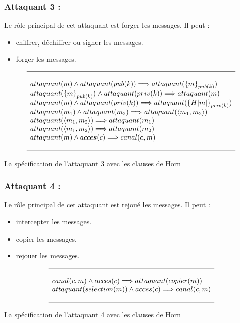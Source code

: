 \documentclass[10pt,a4paper]{article}
\begin{document}
\subsubsection{Attaquant 3 :}
Le rôle principal de cet attaquant est forger les messages. Il peut :
\begin{itemize}
\item chiffrer, déchiffrer ou signer les messages.
\item forger les messages.\\
\end{itemize}
\[
\begin{array}{l}
\hline
\\
attaquant(m)\wedge attaquant(pub(k))\Longrightarrow attaquant({\lbrace m\rbrace}_{pub(k)})
\\
attaquant({\lbrace m\rbrace}_{pub(k)}) \wedge attaquant(priv(k))\Longrightarrow attaquant(m) 
\\ 
attaquant(m)\wedge attaquant(priv(k))\Longrightarrow attaquant({\lbrace H|m|\rbrace}_{priv(k)})
\\
attaquant(m_{1})\wedge attaquant(m_{2})\Longrightarrow attaquant(\langle m_{1},m_{2}\rangle)\\ 
attaquant(\langle m_{1},m_{2}\rangle)\Longrightarrow attaquant(m_{1})\\ 
attaquant(\langle m_{1},m_{2}\rangle)\Longrightarrow attaquant(m_{2})\\ 
attaquant(m)\wedge acces(c)\Longrightarrow canal(c,m)\\
\\
\hline 
  \end{array}
\]
\caption{La spécification de l'attaquant 3 avec les clauses de Horn}

\subsubsection{Attaquant 4 :}
Le rôle principal de cet attaquant est rejoué les messages. Il peut :
\begin{itemize}
\item intercepter les messages.
\item copier les messages.
\item rejouer les messages.\\
\end{itemize}
\[
\begin{array}{l}
\hline
\\
canal(c,m)\wedge acces(c)\Longrightarrow attaquant(copier(m))\\
attaquant(selection(m))\wedge acces(c)\Longrightarrow canal(c,m)\\ 
\\
\hline
 \end{array}
\]
\caption{La spécification de l'attaquant 4 avec les clauses de Horn}
\end{document}
